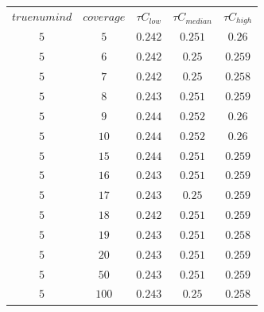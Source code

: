 \begin{table}[H]
\begin{tabular}{ccccc}
$truenumind$ & $coverage$ & ${\tau}C_{low}$ & ${\tau}C_{median}$ & ${\tau}C_{high}$\\
$5$ & $5$ & $0.242$ & $0.251$ & $0.26$\\
$5$ & $6$ & $0.242$ & $0.25$ & $0.259$\\
$5$ & $7$ & $0.242$ & $0.25$ & $0.258$\\
$5$ & $8$ & $0.243$ & $0.251$ & $0.259$\\
$5$ & $9$ & $0.244$ & $0.252$ & $0.26$\\
$5$ & $10$ & $0.244$ & $0.252$ & $0.26$\\
$5$ & $15$ & $0.244$ & $0.251$ & $0.259$\\
$5$ & $16$ & $0.243$ & $0.251$ & $0.259$\\
$5$ & $17$ & $0.243$ & $0.25$ & $0.259$\\
$5$ & $18$ & $0.242$ & $0.251$ & $0.259$\\
$5$ & $19$ & $0.243$ & $0.251$ & $0.258$\\
$5$ & $20$ & $0.243$ & $0.251$ & $0.259$\\
$5$ & $50$ & $0.243$ & $0.251$ & $0.259$\\
$5$ & $100$ & $0.243$ & $0.25$ & $0.258$\\
\end{tabular}
\end{table}
 